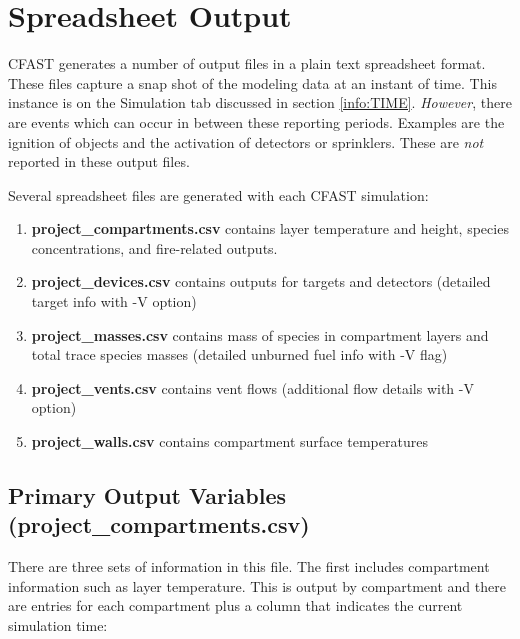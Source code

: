 \section{Spreadsheet Output}

CFAST generates a number of output files in a plain text spreadsheet format.  These files capture a snap shot of the modeling data at an instant of time. This instance is on the Simulation tab discussed in section \ref{info:TIME}. \emph{However}, there are events which can occur in between these reporting periods. Examples are the ignition of objects and the activation of detectors or sprinklers. These are \emph{not} reported in these output files.

Several spreadsheet files are generated with each CFAST simulation:

\begin{enumerate}
\item \textbf{project\_compartments.csv} contains layer temperature and height, species concentrations, and fire-related outputs.
\item \textbf{project\_devices.csv} contains outputs for targets and detectors (detailed target info with -V option)
\item \textbf{project\_masses.csv} contains mass of species in compartment layers and total trace species masses (detailed unburned fuel info with -V flag)
\item \textbf{project\_vents.csv} contains vent flows (additional flow details with -V option)
\item \textbf{project\_walls.csv} contains compartment surface temperatures
\end{enumerate}

\subsection{Primary Output Variables (project\_compartments.csv)}

There are three sets of information in this file. The first includes compartment information such as layer temperature. This is output by compartment and there are entries for each compartment plus a column that indicates the current simulation time:

